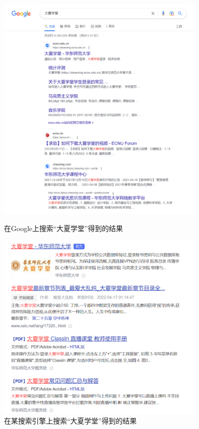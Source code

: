 \documentclass[UTF8,openany]{ctexbook}
\begin{document}
\begin{figure}[H]
    \begin{center}
        \begin{minipage}[b]{0.49\textwidth}
            \includegraphics[width=0.9\textwidth]{images/daxia_google.png}
            \caption{在Google上搜索“大夏学堂”得到的结果}
        \end{minipage}
        \begin{minipage}[b]{0.49\textwidth}
            \includegraphics[width=0.9\textwidth]{images/daxia_baidu.png}
            \caption{在某搜索引擎上搜索“大夏学堂”得到的结果}
        \end{minipage}
    \end{center}
\end{figure}
\end{document}
